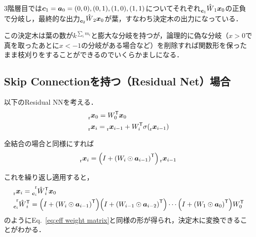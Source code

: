\documentclass[dvipdfmx,autodetect-engine,12pt,fleqn]{jsarticle}
\begin{document}

3階層目では$\bm{c}_{1}=\bm{a}_{0}=(0,0),(0,1),(1,0),(1,1)$についてそれぞれ$\prescript{}{\bm{c}_{1}}{\hat{W}}_{1}\bm{x}_{0}$の正負で分岐し，最終的な出力$\prescript{}{\bm{c}_{2}}{\hat{W}}_{2}\bm{x}_{0}$が葉，すなわち決定木の出力になっている．


この決定木は葉の数が$k^{\sum_i m_i}$と膨大な分岐を持つが，論理的に偽な分岐（$x>0$で真を取ったあとに$x<-1$の分岐がある場合など）を削除すれば関数形を保ったまま枝刈りをすることができるのでいくらかましになる．

\subsection{Skip Connectionを持つ（Residual Net）場合}

\newcommand{\rlayervector}[1]{\prescript{}{\mathrm{r}}{\bm{x}}_{#1}}
以下のResidual NNを考える．
\begin{equation}
\label{eq:ResNet prop}
\begin{split}
&\rlayervector{0}=\weightmatrixT{0}\layervector{0}\\
&\rlayervector{i}=\rlayervector{i-1}+\weightmatrixT{i}\activation{\rlayervector{i-1}}
\end{split}
\end{equation}


全結合の場合と同様にすれば
\begin{equation}
\rlayervector{i}=\qty(I+\qty(\weightmatrix{i}\odot\activeindex{i-1})^\transpose)\rlayervector{i-1}
\end{equation}

これを繰り返し適用すると，
\newcommand{\reffweightmatrix}[2]{\prescript{\mathrm{r}}{#1}{\hat{W}}_{#2}}
\begin{equation}
\label{eq:res eff weight matrix}
\begin{split}
&\rlayervector{i}=\reffweightmatrix{\catindex{i}}{i}^\transpose\layervector{0}\\
&\reffweightmatrix{\catindex{i}}{i}^\transpose=\qty(I+\qty(\weightmatrix{i}\odot\activeindex{i-1})^\transpose)\qty(I+\qty(\weightmatrix{i-1}\odot\activeindex{i-2})^\transpose)\cdots \qty(I+\qty(\weightmatrix{1}\odot\activeindex{0})^\transpose)\weightmatrix{0}^\transpose
\end{split}
\end{equation}
のようにEq.~\eqref{eq:eff weight matrix}と同様の形が得られ，決定木に変換できることがわかる．
\end{document}

